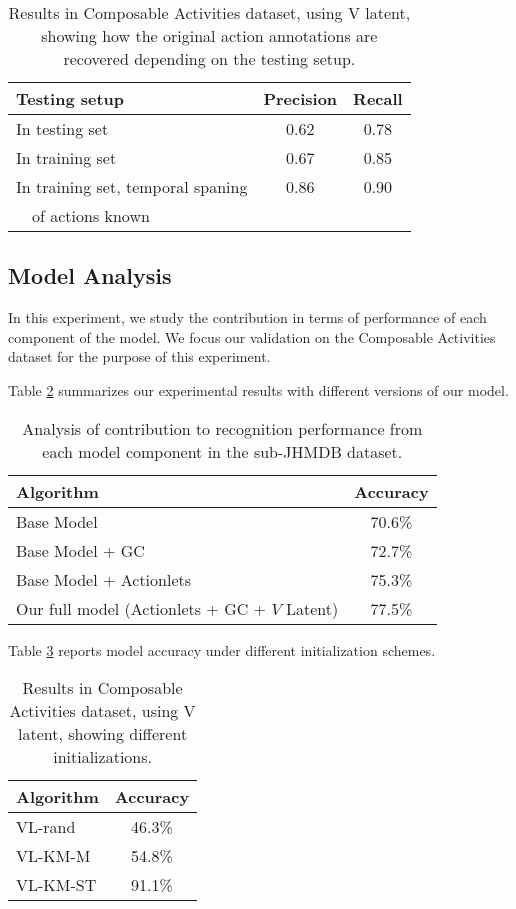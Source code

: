 \begin{table}
\footnotesize
\centering
\begin{tabular}{|l|c|c|}
\hline
\textbf{Testing setup} & \textbf{Precision} & \textbf{Recall}\\
\hline
In testing set   & 0.62 & 0.78 \\
In training set  & 0.67 & 0.85 \\
In training set, temporal spaning  & 0.86 & 0.90\\ ~~of actions known & &  \\
\hline
\end{tabular}
\caption{Results in Composable Activities dataset, using V latent, showing how the original action annotations are recovered depending on the testing setup. }
\label{tab:annotation}
\end{table}



\subsection{Model Analysis}
In this experiment,
we study the contribution in terms of performance of each component of the
model.
We focus our validation on the Composable Activities dataset for the purpose
of this experiment.

Table \ref{tab:components} summarizes our experimental results with different
versions of our model.

\begin{table}
\footnotesize
\centering
\begin{tabular}{|l|c|}
\hline
\textbf{Algorithm} & \textbf{Accuracy}\\
\hline
Base Model & 70.6\%\\
Base Model + GC & 72.7\% \\
Base Model + Actionlets & 75.3\%\\
Our full model (Actionlets + GC + $V$ Latent) &  77.5\% \\
\hline
\end{tabular}
\caption{Analysis of contribution to recognition performance from
each model component in the sub-JHMDB dataset.}
\label{tab:components}
\end{table}

Table \ref{tab:initialization} reports model accuracy under different initialization
schemes.

\begin{table}
\footnotesize
\centering
\begin{tabular}{|l|c|}
\hline
\textbf{Algorithm} & \textbf{Accuracy}\\
\hline
VL-rand   & 46.3\% \\
VL-KM-M   & 54.8\% \\
VL-KM-ST   & 91.1\% \\
\hline
\end{tabular}
\caption{Results in Composable Activities dataset, using V latent, showing different initializations. }
\label{tab:initialization}
\end{table}


